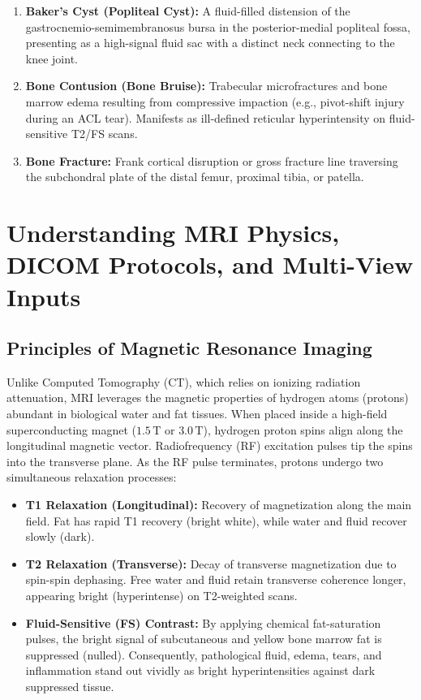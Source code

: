 \documentclass[11pt,a4paper]{article}
\begin{document}
\begin{enumerate}[leftmargin=*]
    \item \textbf{Baker's Cyst (Popliteal Cyst):} A fluid-filled distension of the gastrocnemio-semimembranosus bursa in the posterior-medial popliteal fossa, presenting as a high-signal fluid sac with a distinct neck connecting to the knee joint.
    \item \textbf{Bone Contusion (Bone Bruise):} Trabecular microfractures and bone marrow edema resulting from compressive impaction (e.g., pivot-shift injury during an ACL tear). Manifests as ill-defined reticular hyperintensity on fluid-sensitive T2/FS scans.
    \item \textbf{Bone Fracture:} Frank cortical disruption or gross fracture line traversing the subchondral plate of the distal femur, proximal tibia, or patella.
\end{enumerate}

\section{Understanding MRI Physics, DICOM Protocols, and Multi-View Inputs}

\subsection{Principles of Magnetic Resonance Imaging}
Unlike Computed Tomography (CT), which relies on ionizing radiation attenuation, MRI leverages the magnetic properties of hydrogen atoms (protons) abundant in biological water and fat tissues. When placed inside a high-field superconducting magnet ($1.5\,\text{T}$ or $3.0\,\text{T}$), hydrogen proton spins align along the longitudinal magnetic vector. Radiofrequency (RF) excitation pulses tip the spins into the transverse plane. As the RF pulse terminates, protons undergo two simultaneous relaxation processes:
\begin{itemize}[leftmargin=*]
    \item \textbf{T1 Relaxation (Longitudinal):} Recovery of magnetization along the main field. Fat has rapid T1 recovery (bright white), while water and fluid recover slowly (dark).
    \item \textbf{T2 Relaxation (Transverse):} Decay of transverse magnetization due to spin-spin dephasing. Free water and fluid retain transverse coherence longer, appearing bright (hyperintense) on T2-weighted scans.
    \item \textbf{Fluid-Sensitive (FS) Contrast:} By applying chemical fat-saturation pulses, the bright signal of subcutaneous and yellow bone marrow fat is suppressed (nulled). Consequently, pathological fluid, edema, tears, and inflammation stand out vividly as bright hyperintensities against dark suppressed tissue.
\end{itemize}
\end{document}
